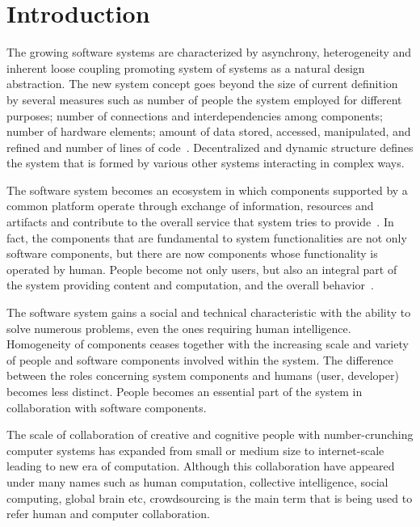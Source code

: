 \chapter{Introduction} 


The growing software systems are characterized by asynchrony, 
heterogeneity and inherent loose coupling promoting system of systems 
as a natural design abstraction. The new system concept goes beyond 
the size of current definition by several measures such as 
number of people the system employed for different purposes; 
number of connections and interdependencies among components; 
number of hardware elements; 
amount of data stored, accessed, manipulated, and refined 
and number of lines of code~\cite{ULSReport}. Decentralized and dynamic 
structure defines the system that is formed by various other systems interacting 
in complex ways.

The software system becomes an ecosystem in which components supported by 
a common platform operate through exchange of information, resources and 
artifacts and contribute to the overall service that system tries to provide~\cite{Ecosystem}. 
In fact, the components that are fundamental to system 
functionalities are not only software components, but there are now components 
whose functionality is operated by human. People become not only users, 
but also an integral part of the system providing 
content and computation, and the overall behavior~\cite{ULSReport}.

The software system gains a social 
and technical characteristic with the ability to solve numerous problems, 
even the ones requiring human intelligence. Homogeneity 
of components ceases together with the increasing scale and variety of people 
and software components involved within the system. The difference between 
the roles concerning system components and 
humans (user, developer) becomes less distinct. People becomes an essential 
part of the system in collaboration with software components.

The scale of collaboration of creative and cognitive people with 
number-crunching computer systems has expanded from small or 
medium size to internet-scale~\cite{Dorn2012b} leading to new era of 
computation. Although this collaboration have appeared under many names 
such as human computation, collective intelligence, social computing, 
global brain etc, crowdsourcing is the main term that is being used to refer 
human and computer collaboration.

